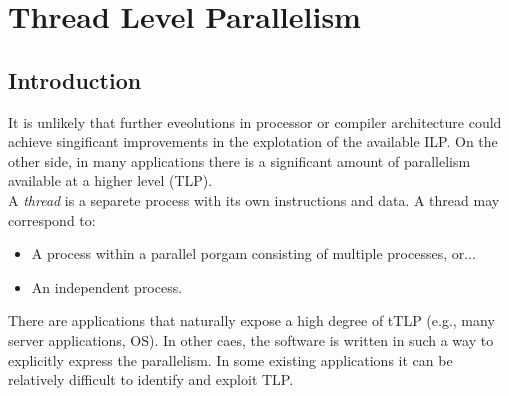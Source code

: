 \documentclass[12pt]{article}
\begin{document}
\section{Thread Level Parallelism}
\subsection{Introduction}
It is unlikely that further eveolutions in processor or compiler architecture could achieve singificant improvements in the explotation of the available ILP. On the other side, in many applications there is a significant amount of parallelism available at a higher level (TLP).\\
A \textit{thread} is a separete process with its own instructions and data. A thread may correspond to:
\begin{itemize}
  \item A process within a parallel porgam consisting of multiple processes, or...
  \item An independent process.
\end{itemize}
There are applications that naturally expose a high degree of tTLP (e.g., many server applications, OS). In other caes, the software is written in such a way to explicitly express the parallelism. In some existing applications it can be relatively difficult to identify and exploit TLP.
\end{document}
